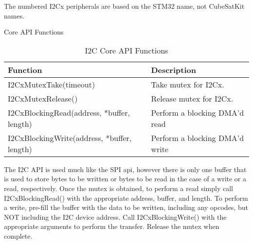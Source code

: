 \documentclass{article}
\begin{document}
The numbered I2Cx peripherals are based on the STM32 name, not CubeSatKit names.

Core API Functions
\begin{table}
\begin{center}
\caption{I2C Core API Functions}
\begin{tabular}{| l | l |}
    \hline 
    Function & Description \\ \hline
    I2CxMutexTake(timeout) & Take mutex for I2Cx.  \\ \hline
    I2CxMutexRelease() & Release mutex for I2Cx. \\ \hline
    I2CxBlockingRead(address, *buffer, length) & Perform a blocking DMA'd read \\ \hline
    I2CxBlockingWrite(address, *buffer, length) & Perform a blocking DMA'd write \\ \hline
\end{tabular}
\end{center}
\end{table}

The I2C API is used much like the SPI api, however there is only one buffer that
is used to store bytes to be written or bytes to be read in the case of a write
or a read, respectively. Once the mutex is obtained, to perform a read simply
call I2CxBlockingRead() with the appropriate address, buffer, and length. To 
perform a write, pre-fill the buffer with the data to be written, including any
opcodes, but NOT including the I2C device address. Call I2CxBlockingWrite() with
the appropriate arguments to perform the transfer. Release the mutex when complete.
\end{document}
